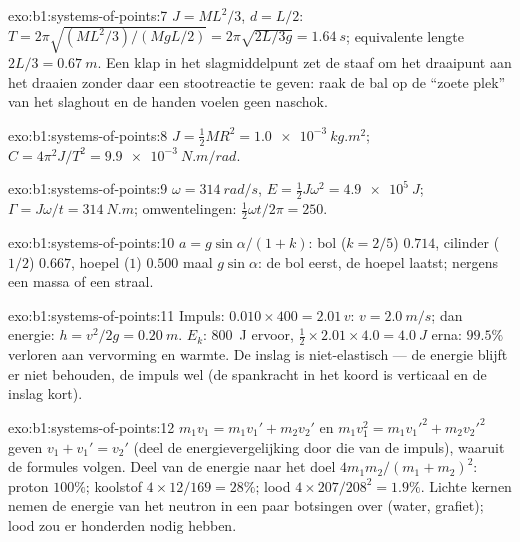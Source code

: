 \begin{solution}{exo:b1:systems-of-points:7}
$J = ML^2/3$, $d = L/2$: $T = 2\pi\sqrt{(ML^2/3)/(MgL/2)} = 2\pi\sqrt{2L/3g}
= \qty{1.64}{s}$; equivalente lengte $2L/3 = \qty{0.67}{m}$. Een klap in het
slagmiddelpunt zet de staaf om het draaipunt aan het draaien zonder daar een
stootreactie te geven: raak de bal op de ``zoete plek'' van het slaghout en
de handen voelen geen naschok.
\end{solution}

\begin{solution}{exo:b1:systems-of-points:8}
$J = \tfrac12 MR^2 = \qty{1.0e-3}{kg.m^2}$; $C = 4\pi^2J/T^2 = \qty{9.9e-3}{N.m/rad}$.
\end{solution}

\begin{solution}{exo:b1:systems-of-points:9}
$\omega = \qty{314}{rad/s}$, $E = \tfrac12 J\omega^2 = \qty{4.9e5}{J}$;
$\Gamma = J\omega/t = \qty{314}{N.m}$; omwentelingen: $\tfrac12\omega t/2\pi = 250$.
\end{solution}

\begin{solution}{exo:b1:systems-of-points:10}
$a = g\sin\alpha/(1 + k)$: bol ($k = 2/5$) $0.714$, cilinder ($1/2$)
$0.667$, hoepel ($1$) $0.500$ maal $g\sin\alpha$: de bol eerst, de hoepel laatst;
nergens een massa of een straal.
\end{solution}

\begin{solution}{exo:b1:systems-of-points:11}
Impuls: $0.010 \times 400 = 2.01\,v$: $v = \qty{2.0}{m/s}$; dan energie:
$h = v^2/2g = \qty{0.20}{m}$. $E_k$: \qty{800}{J} ervoor, $\tfrac12 \times
2.01 \times 4.0 = \qty{4.0}{J}$ erna: $99.5\%$ verloren aan vervorming en
warmte. De inslag is niet-elastisch --- de energie blijft er niet behouden,
de impuls wel (de spankracht in het koord is verticaal en de inslag kort).
\end{solution}

\begin{solution}{exo:b1:systems-of-points:12}
$m_1v_1 = m_1v_1' + m_2v_2'$ en $m_1v_1^2 = m_1v_1'^2 + m_2v_2'^2$ geven
$v_1 + v_1' = v_2'$ (deel de energievergelijking door die van de impuls),
waaruit de formules volgen. Deel van de energie naar het doel $4m_1m_2/(m_1 + m_2)^2$:
proton $100\%$; koolstof $4 \times 12/169 = 28\%$; lood $4 \times 207/208^2 =
1.9\%$. Lichte kernen nemen de energie van het neutron in een paar botsingen over
(water, grafiet); lood zou er honderden nodig hebben.
\end{solution}

